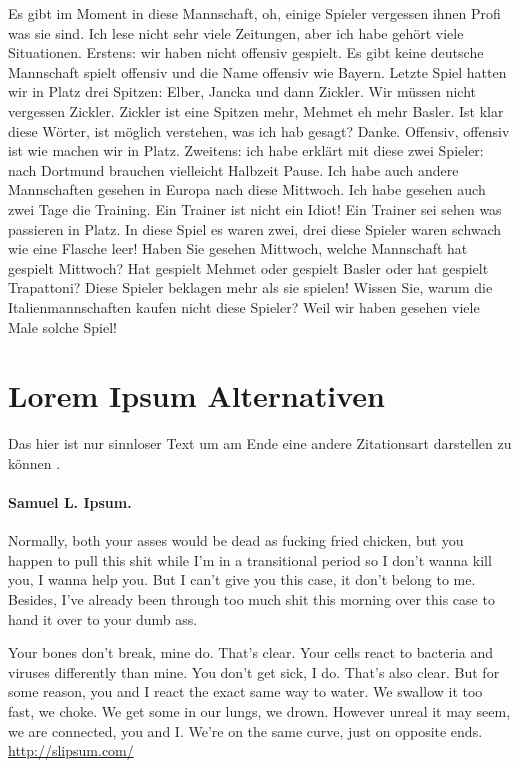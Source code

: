 \documentclass[12pt,        %
  english,ngerman,          %
  paper=a4,                 %
  captions=tablesignature,  %
  listof=numbered,          %
  bibliography=totoc,       %
  headings=small,           %
  headinclude=false,        %
  footinclude=false,        %
  parskip=half-,            %
  oneside,                  %
  DIV=12                    %
]{styles/colireport}
\begin{document}
Es gibt im Moment in diese Mannschaft, oh, einige Spieler vergessen ihnen Profi was sie sind. Ich lese nicht sehr viele Zeitungen, aber ich habe gehört viele Situationen. Erstens: wir haben nicht offensiv gespielt. Es gibt keine deutsche Mannschaft spielt offensiv und die Name offensiv wie Bayern. Letzte Spiel hatten wir in Platz drei Spitzen: Elber, Jancka und dann Zickler. Wir müssen nicht vergessen Zickler. Zickler ist eine Spitzen mehr, Mehmet eh mehr Basler. Ist klar diese Wörter, ist möglich verstehen, was ich hab gesagt? Danke. Offensiv, offensiv ist wie machen wir in Platz. Zweitens: ich habe erklärt mit diese zwei Spieler: nach Dortmund brauchen vielleicht Halbzeit Pause. Ich habe auch andere Mannschaften gesehen in Europa nach diese Mittwoch. Ich habe gesehen auch zwei Tage die Training. Ein Trainer ist nicht ein Idiot! Ein Trainer sei sehen was passieren in Platz. In diese Spiel es waren zwei, drei diese Spieler waren schwach wie eine Flasche leer! Haben Sie gesehen Mittwoch, welche Mannschaft hat gespielt Mittwoch? Hat gespielt Mehmet oder gespielt Basler oder hat gespielt Trapattoni? Diese Spieler beklagen mehr als sie spielen! Wissen Sie, warum die Italienmannschaften kaufen nicht diese Spieler? Weil wir haben gesehen viele Male solche Spiel! \cite{Bottou2014}


\section*{Lorem Ipsum Alternativen}

Das hier ist nur sinnloser Text um am Ende eine andere Zitationsart darstellen zu können \citealp{Wartena2015}.

\paragraph*{Samuel L. Ipsum.}  Normally, both your asses would be dead as fucking fried chicken, but you happen to pull this shit while I'm in a transitional period so I don't wanna kill you, I wanna help you. But I can't give you this case, it don't belong to me. Besides, I've already been through too much shit this morning over this case to hand it over to your dumb ass.

Your bones don't break, mine do. That's clear. Your cells react to bacteria and viruses differently than mine. You don't get sick, I do. That's also clear. But for some reason, you and I react the exact same way to water. We swallow it too fast, we choke. We get some in our lungs, we drown. However unreal it may seem, we are connected, you and I. We're on the same curve, just on opposite ends.
\url{http://slipsum.com/}
\end{document}
